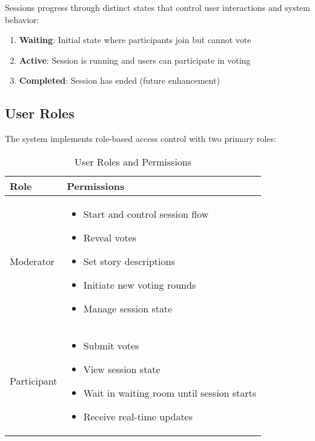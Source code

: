 \documentclass[11pt,a4paper]{article}
\begin{document}
Sessions progress through distinct states that control user interactions and system behavior:

\begin{enumerate}
    \item \textbf{Waiting}: Initial state where participants join but cannot vote
    \item \textbf{Active}: Session is running and users can participate in voting
    \item \textbf{Completed}: Session has ended (future enhancement)
\end{enumerate}

\subsection{User Roles}

The system implements role-based access control with two primary roles:

\begin{table}[H]
\centering
\begin{tabular}{@{}lp{8cm}@{}}
\toprule
\textbf{Role} & \textbf{Permissions} \\
\midrule
Moderator & 
\begin{minipage}[t]{8cm}
\begin{itemize}
    \item Start and control session flow
    \item Reveal votes
    \item Set story descriptions
    \item Initiate new voting rounds
    \item Manage session state
\end{itemize}
\end{minipage} \\
\midrule
Participant & 
\begin{minipage}[t]{8cm}
\begin{itemize}
    \item Submit votes
    \item View session state
    \item Wait in waiting room until session starts
    \item Receive real-time updates
\end{itemize}
\end{minipage} \\
\bottomrule
\end{tabular}
\caption{User Roles and Permissions}
\label{tab:user-roles}
\end{table}
\end{document}

